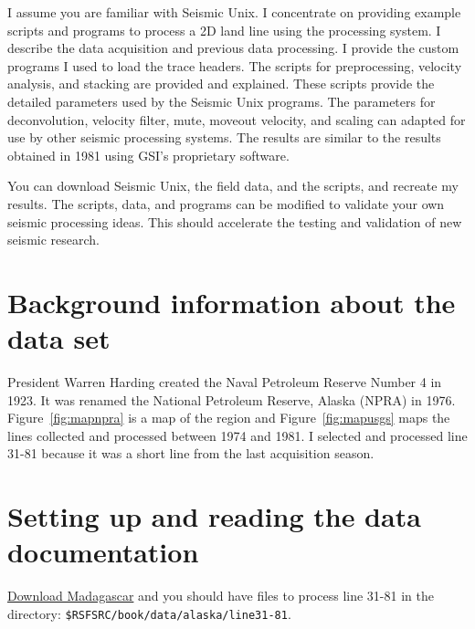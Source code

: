 I assume you are familiar with Seismic Unix.  I concentrate
on providing example scripts and programs to process a 2D land line
using the processing system. I describe the data acquisition and
previous data processing.  I provide the custom programs I used to
load the trace headers.  The scripts for preprocessing, velocity
analysis, and stacking are provided and explained.  These scripts
provide the detailed parameters used by the Seismic Unix programs.
The parameters for deconvolution, velocity filter, mute, moveout
velocity, and scaling can adapted for use by other seismic processing
systems. The results are similar to the results obtained in 1981 using
GSI's proprietary software.  

You can download Seismic Unix, the field data, and the scripts, and 
recreate my results.  The scripts, data, and programs can be modified 
to validate your own seismic processing ideas.  This should accelerate 
the testing and validation of new seismic research.

\section{Background information about the data set}

President Warren Harding created the Naval Petroleum Reserve Number 4
in 1923.  It was renamed the National Petroleum Reserve, Alaska (NPRA)
in 1976.  Figure~\ref{fig:mapnpra} is a map of the region and 
Figure~\ref{fig:mapusgs} maps the lines collected and processed between 1974
and 1981.  I selected and processed line 31-81 because it was a short
line from the last acquisition season.

\section{Setting up and reading the data documentation}
\href{http://www.ahay.org/wiki/Download}{Download Madagascar} and you should have files to process line 31-81 in 
the directory: \texttt{\$RSFSRC/book/data/alaska/line31-81}.

